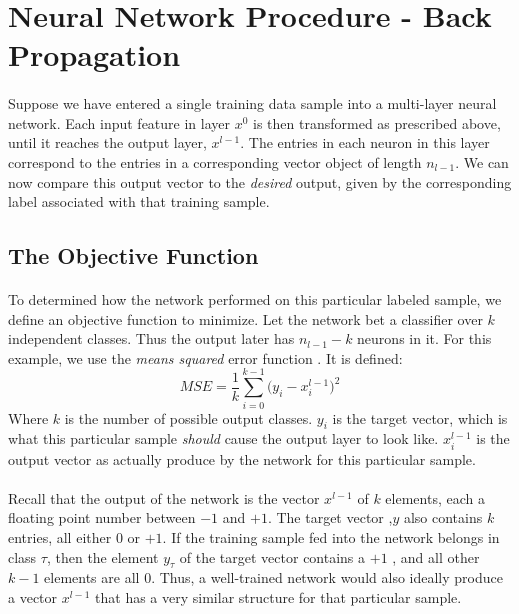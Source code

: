 \documentclass[12pt,letterpaper]{article}
\begin{document}

\section{Neural Network Procedure - Back Propagation}
\paragraph*{}Suppose we have entered a single training data sample into a multi-layer neural network. Each input feature in layer $x^0$ is then transformed as prescribed above, until it reaches the output layer, $x^{l-1}$. The entries in each neuron in this layer correspond to the entries in a corresponding vector object of length $n_{l-1}$. We can now compare this output vector to the \textit{desired} output, given by the corresponding label associated with that training sample.


\subsection{The Objective Function}
\paragraph*{}To determined how the network performed on this particular labeled sample, we define an objective function to minimize. Let the network bet a classifier over $k$ independent classes. Thus the output later has $n_{l-1} - k$ neurons in it. For this example, we use the \textit{means squared} error function \cite{James}. It is defined:
\begin{equation}
\label{MSE}
MSE = \frac{1}{k}\sum_{i=0}^{k-1} \Big( y_i - x^{l-1}_i \Big)^2
\end{equation}
Where $k$ is the number of possible output classes. $y_i$ is the target vector, which is what this particular sample \textit{should} cause the output layer to look like. $x^{l-1}_i$ is the output vector as actually produce by the network for this particular sample. 
\paragraph*{}Recall that the output of the network is the vector $x^{l-1}$ of $k$ elements, each a floating point number between $-1$ and $+1$. The target vector ,$y$ also contains $k$ entries, all either $0$ or $+1$. If the training sample fed into the network belongs in class $\tau$, then the element $y_\tau$ of the target vector contains a $+1$ , and all other $k-1$ elements are all $0$. Thus, a well-trained network would also ideally produce a vector $x^{l-1}$ that has a very similar structure for that particular sample.
\end{document}
